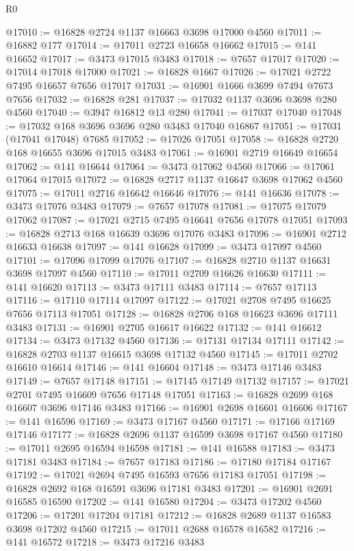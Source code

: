 \begin{lexlean}{R0}
\begin{coremodule}
@17010 := @16828 @2724 @1137 @16663 @3698 @17000 @4560
@17011 := @16882 @177
@17014 := @17011 @2723 @16658 @16662
@17015 := @141 @16652
@17017 := @3473 @17015 @3483
@17018 := @7657 @17017
@17020 := @17014 @17018 @17000
@17021 := @16828 @1667
@17026 := @17021 @2722 @7495 @16657 @7656 @17017
@17031 := @16901 @1666 @3699 @7494 @7673 @7656
@17032 := @16828 @281
@17037 := @17032 @1137 @3696 @3698 @280 @4560
@17040 := @3947 @16812 @13 @280
@17041 := @17037 @17040
@17048 := @17032 @168 @3696 @3696 @280 @3483 @17040 @16867
@17051 := @17031 (@17041 @17048) @7685
@17052 := @17026 @17051
@17058 := @16828 @2720 @168 @16655 @3696 @17015 @3483
@17061 := @16901 @2719 @16649 @16654
@17062 := @141 @16644
@17064 := @3473 @17062 @4560
@17066 := @17061 @17064 @17015
@17072 := @16828 @2717 @1137 @16647 @3698 @17062 @4560
@17075 := @17011 @2716 @16642 @16646
@17076 := @141 @16636
@17078 := @3473 @17076 @3483
@17079 := @7657 @17078
@17081 := @17075 @17079 @17062
@17087 := @17021 @2715 @7495 @16641 @7656 @17078 @17051
@17093 := @16828 @2713 @168 @16639 @3696 @17076 @3483
@17096 := @16901 @2712 @16633 @16638
@17097 := @141 @16628
@17099 := @3473 @17097 @4560
@17101 := @17096 @17099 @17076
@17107 := @16828 @2710 @1137 @16631 @3698 @17097 @4560
@17110 := @17011 @2709 @16626 @16630
@17111 := @141 @16620
@17113 := @3473 @17111 @3483
@17114 := @7657 @17113
@17116 := @17110 @17114 @17097
@17122 := @17021 @2708 @7495 @16625 @7656 @17113 @17051
@17128 := @16828 @2706 @168 @16623 @3696 @17111 @3483
@17131 := @16901 @2705 @16617 @16622
@17132 := @141 @16612
@17134 := @3473 @17132 @4560
@17136 := @17131 @17134 @17111
@17142 := @16828 @2703 @1137 @16615 @3698 @17132 @4560
@17145 := @17011 @2702 @16610 @16614
@17146 := @141 @16604
@17148 := @3473 @17146 @3483
@17149 := @7657 @17148
@17151 := @17145 @17149 @17132
@17157 := @17021 @2701 @7495 @16609 @7656 @17148 @17051
@17163 := @16828 @2699 @168 @16607 @3696 @17146 @3483
@17166 := @16901 @2698 @16601 @16606
@17167 := @141 @16596
@17169 := @3473 @17167 @4560
@17171 := @17166 @17169 @17146
@17177 := @16828 @2696 @1137 @16599 @3698 @17167 @4560
@17180 := @17011 @2695 @16594 @16598
@17181 := @141 @16588
@17183 := @3473 @17181 @3483
@17184 := @7657 @17183
@17186 := @17180 @17184 @17167
@17192 := @17021 @2694 @7495 @16593 @7656 @17183 @17051
@17198 := @16828 @2692 @168 @16591 @3696 @17181 @3483
@17201 := @16901 @2691 @16585 @16590
@17202 := @141 @16580
@17204 := @3473 @17202 @4560
@17206 := @17201 @17204 @17181
@17212 := @16828 @2689 @1137 @16583 @3698 @17202 @4560
@17215 := @17011 @2688 @16578 @16582
@17216 := @141 @16572
@17218 := @3473 @17216 @3483

\end{coremodule}
\end{lexlean}
